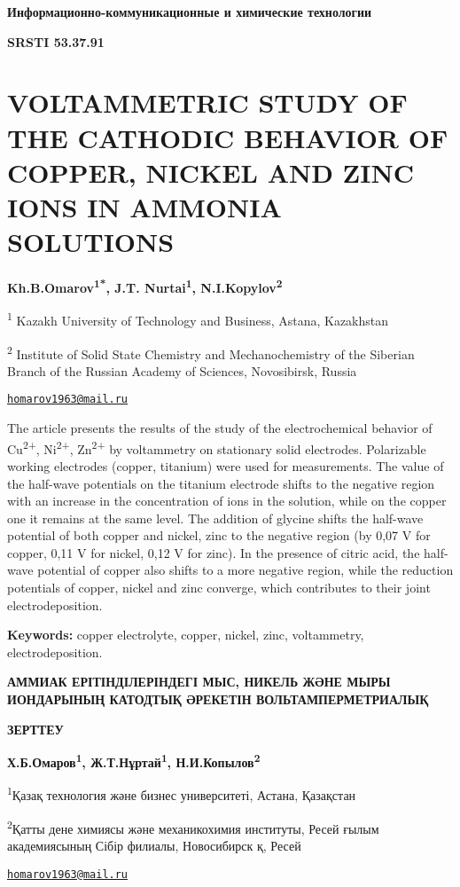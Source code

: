 {\bfseries Информационно-коммуникационные и химические технологии}

{\bfseries SRSTI 53.37.91}

\section{VOLTAMMETRIC STUDY OF THE CATHODIC BEHAVIOR OF COPPER, NICKEL
AND ZINC IONS IN AMMONIA SOLUTIONS}

\begin{center}
{\bfseries Kh.B.Omarov\textsuperscript{1*}, J.T. Nurtai\textsuperscript{1},
N.I.Kopylov\textsuperscript{2}}

\textsuperscript{1} Kazakh University of Technology and Business,
Astana, Kazakhstan

\textsuperscript{2} Institute of Solid State Chemistry and
Mechanochemistry of the Siberian Branch of the Russian Academy of
Sciences, Novosibirsk, Russia

\href{mailto:homarov1963@mail.ru}{\nolinkurl{homarov1963@mail.ru}}
\end{center}

The article presents the results of the study of the electrochemical
behavior of Cu\textsuperscript{2+}, Ni\textsuperscript{2+},
Zn\textsuperscript{2+} by voltammetry on stationary solid electrodes.
Polarizable working electrodes (copper, titanium) were used for
measurements. The value of the half-wave potentials on the titanium
electrode shifts to the negative region with an increase in the
concentration of ions in the solution, while on the copper one it
remains at the same level. The addition of glycine shifts the half-wave
potential of both copper and nickel, zinc to the negative region (by
0,07 V for copper, 0,11 V for nickel, 0,12 V for zinc). In the presence
of citric acid, the half-wave potential of copper also shifts to a more
negative region, while the reduction potentials of copper, nickel and
zinc converge, which contributes to their joint electrodeposition.

{\bfseries Keywords:} copper electrolyte, copper, nickel, zinc,
voltammetry, electrodeposition.

\begin{center}
{\large\bfseries АММИАК ЕРІТІНДІЛЕРІНДЕГІ МЫС, НИКЕЛЬ ЖӘНЕ МЫРЫ ИОНДАРЫНЫҢ КАТОДТЫҚ ӘРЕКЕТІН ВОЛЬТАМПЕРМЕТРИАЛЫҚ}

{\bfseries ЗЕРТТЕУ}

{\bfseries Х.Б.Омаров\textsuperscript{1}, Ж.Т.Нұртай\textsuperscript{1},
Н.И.Копылов\textsuperscript{2}}

\textsuperscript{1}Қазақ технология және бизнес университеті, Астана,
Қазақстан

\textsuperscript{2}Қатты дене химиясы және механикохимия институты,
Ресей ғылым академиясының Сібір филиалы, Новосибирск қ, Ресей

\href{mailto:homarov1963@mail.ru}{\nolinkurl{homarov1963@mail.ru}}
\end{center}

